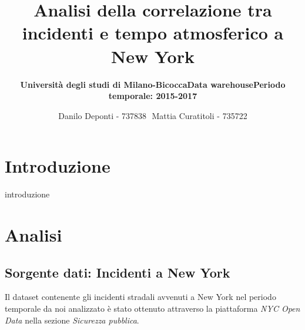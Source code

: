 \documentclass[11pt, a4paper]{scrartcl}
\subtitle{\textbf{Università degli studi di Milano-Bicocca}}
\subtitle{\textbf{Data warehouse}}
\title{\textbf{Analisi della correlazione tra incidenti e tempo atmosferico a New York}}
\subtitle{\textbf{Periodo temporale: 2015-2017}}
\author{Danilo Deponti - 737838 $    $ Mattia Curatitoli - 735722} \date{}
\begin{document}
\maketitle
 
\section*{Introduzione}
introduzione

\section*{Analisi}

\subsection*{Sorgente dati: Incidenti a New York}
Il dataset contenente gli incidenti stradali avvenuti a New York nel periodo temporale da noi analizzato è stato ottenuto attraverso la piattaforma \emph{NYC Open Data} nella sezione \emph{Sicurezza pubblica}.
\end{document}

